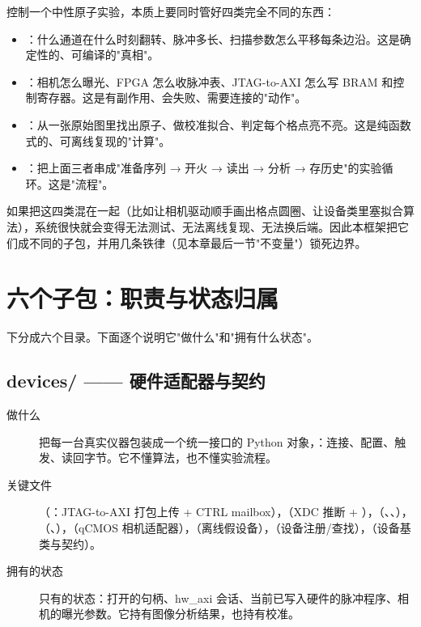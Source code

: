 \documentclass[11pt,oneside,openany]{book}
\begin{document}
控制一个中性原子实验，本质上要同时管好四类完全不同的东西：

\begin{itemize}
\item {}：什么通道在什么时刻翻转、脉冲多长、扫描参数怎么平移每条边沿。这是确定性的、可编译的"真相"。
\item {}：相机怎么曝光、FPGA 怎么收脉冲表、JTAG-to-AXI 怎么写 BRAM 和控制寄存器。这是有副作用、会失败、需要连接的"动作"。
\item {}：从一张原始图里找出原子、做校准拟合、判定每个格点亮不亮。这是纯函数式的、可离线复现的"计算"。
\item {}：把上面三者串成"准备序列 → 开火 → 读出 → 分析 → 存历史"的实验循环。这是"流程"。
\end{itemize}

如果把这四类混在一起（比如让相机驱动顺手画出格点圆圈、让设备类里塞拟合算法），系统很快就会变得无法测试、无法离线复现、无法换后端。因此本框架把它们成不同的子包，并用几条铁律（见本章最后一节"不变量"）锁死边界。

\section{六个子包：职责与状态归属}

 下分成六个目录。下面逐个说明它"做什么"和"拥有什么状态"。

\subsection{devices/ —— 硬件适配器与契约}

\begin{description}
\item[做什么] 把每一台真实仪器包装成一个统一接口的 Python 对象，：连接、配置、触发、读回字节。它不懂算法，也不懂实验流程。
\item[关键文件] （：JTAG-to-AXI 打包上传 + CTRL mailbox），（XDC 推断 + ），（、、），（、），（qCMOS 相机适配器），（离线假设备），（设备注册/查找），（设备基类与契约）。
\item[拥有的状态] 只有的状态：打开的句柄、hw\_axi 会话、当前已写入硬件的脉冲程序、相机的曝光参数。它持有图像分析结果，也持有校准。
\end{description}
\end{document}
